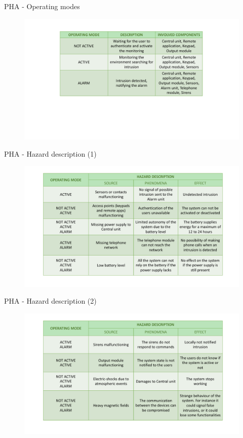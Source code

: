 \begin{frame}{PHA - Operating modes}
\vskip 0.9cm
    \begin{figure}[ht!]
      \centering
      \includegraphics[width=120mm]{images/operating_modes.pdf}
      \label{fig:operating_modes}
    \end{figure}
\end{frame}

\begin{frame}{PHA - Hazard description (1)}
\vskip 0.9cm
    \begin{figure}[ht!]
      \centering
      \includegraphics[width=120mm]{images/hazard_description1.pdf}
      \label{fig:hazard_description}
    \end{figure}
\end{frame}

\begin{frame}{PHA - Hazard description (2)}
\vskip 0.9cm
    \begin{figure}[ht!]
      \centering
      \includegraphics[width=120mm]{images/hazard_description2.pdf}
    \end{figure}
\end{frame}

